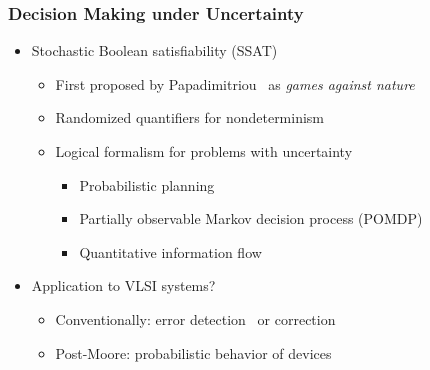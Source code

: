 \begin{frame}
      \frametitle{Decision Making under Uncertainty}
      \begin{itemize}
            \item Stochastic Boolean satisfiability (SSAT)
                  \begin{itemize}
                        \item First proposed by Papadimitriou~\cite{Papadimitriou1985} as \emph{games against nature}
                        \item Randomized quantifiers for nondeterminism
                        \item Logical formalism for problems with uncertainty
                              \begin{itemize}
                                    \item Probabilistic planning~\cite{Majercik1998,
                                                Majercik2003,
                                                Majercik2005}
                                    \item Partially observable Markov decision process (POMDP)~\cite{Salmon2020}
                                    \item Quantitative information flow~\cite{Fremont2017}
                              \end{itemize}
                  \end{itemize}
                  \pause
            \item Application to VLSI systems?
                  \begin{itemize}
                        \item Conventionally: error detection~\cite{Constantinescu2003} or correction~\cite{Mitra2006}
                        \item Post-Moore: probabilistic behavior of devices~\cite{Chakrapani2006ProbDesign}
                  \end{itemize}
      \end{itemize}
\end{frame}

